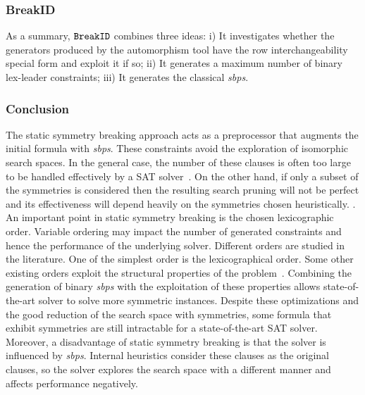 \subsubsection{BreakID}
As a summary, $\texttt{BreakID}$ combines three ideas: i) It investigates whether the generators produced by the automorphism tool have the row interchangeability special form  and exploit it if so;
ii) It generates a maximum number of binary lex-leader constraints; iii) It generates the classical \textit{sbps}.

%

\subsubsection{Conclusion}
The static symmetry breaking approach acts as a preprocessor that augments the initial formula with
\textit{sbps}. These constraints avoid the exploration of isomorphic search spaces.
In the general case, the number of these clauses is often too large to be
 handled  effectively by a SAT solver~\cite{Luks2004}. 
On the other hand, if only a subset of the symmetries is considered then the resulting search pruning
will not be perfect and its effectiveness will depend heavily on the symmetries chosen heuristically. 
 \cite{biere2009handbook}.
An important point in static symmetry breaking is the chosen lexicographic order.
Variable ordering may impact the number of generated constraints and hence the performance of
the underlying solver. Different orders are studied in the literature. 
One of the simplest order is the  lexicographical order.
Some other existing orders exploit the structural properties of the 
problem~\cite{devriendt2016improved}. Combining the generation of binary \textit{sbps} with the exploitation of
these properties allows state-of-the-art solver to solve more symmetric instances.
Despite these optimizations and the good reduction of the search space with symmetries,
some formula that exhibit symmetries are still intractable for a state-of-the-art SAT solver.
Moreover, a disadvantage of static symmetry breaking is that the solver is influenced by \textit{sbps}.
Internal heuristics consider these clauses as the original clauses, so the solver explores
the search space with a different manner and affects performance negatively.

